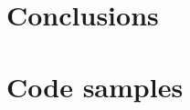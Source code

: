 \documentclass[11pt,chapterprefix=true,toc=bibliography,numbers=noendperiod,
               footnotes=multiple,twoside]{scrreprt}
\begin{document}


\chapter{Conclusions\label{ch:conclusions}}


\printbibliography


\appendix

\chapter{Code samples\label{ch:code-samples}}

%
%
\end{document}
